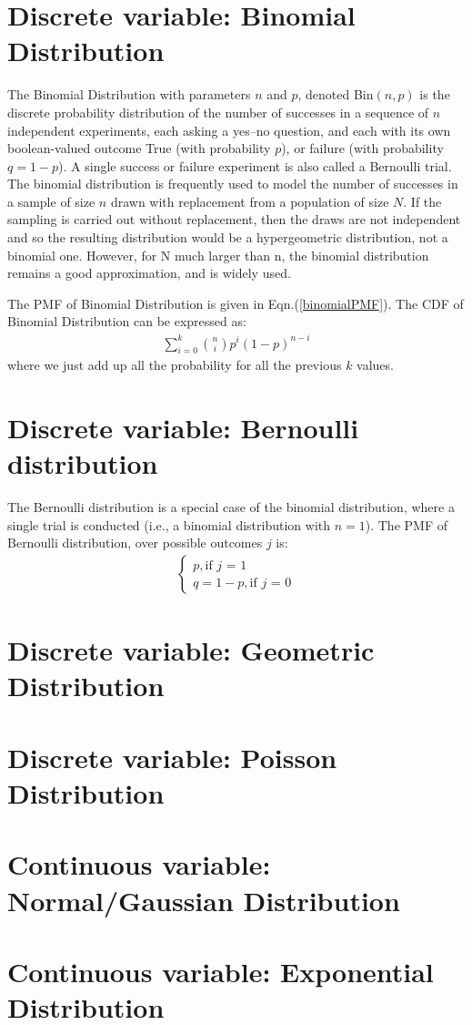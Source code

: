 \section{Discrete variable: Binomial Distribution}

The Binomial Distribution with parameters $n$ and $p$, denoted Bin$(n,p)$ is the discrete probability distribution of the number of successes in a sequence of $n$ independent experiments, each asking a yes–no question, and each with its own boolean-valued outcome True (with probability $p$), or failure (with probability $q = 1- p$). A single success or failure experiment is also called a Bernoulli trial. \\

The binomial distribution is frequently used to model the number of successes in a sample of size $n$ drawn with replacement from a population of size $N$. If the sampling is carried out without replacement, then the draws are not independent and so the resulting distribution would be a hypergeometric distribution, not a binomial one. However, for N much larger than n, the binomial distribution remains a good approximation, and is widely used.

The PMF of Binomial Distribution is given in Eqn.(\ref{binomialPMF}). The CDF of Binomial Distribution can be expressed as:
\begin{eqnarray}
\sum_{i=0}^{k} \binom{n}{i} p^i (1-p)^{n-i}
\label{binomialCDF}
\end{eqnarray}
where we just add up all the probability for all the previous $k$ values.

\section{Discrete variable: Bernoulli distribution}
The Bernoulli distribution is a special case of the binomial distribution, where a single trial is conducted (i.e., a binomial distribution with $n = 1$). The PMF of Bernoulli distribution, over possible outcomes $j$ is:
\begin{eqnarray}
\begin{cases}
p,             \text{if $j$ = 1}\\
q = 1-p,      \text{if $j$ = 0}
\end{cases}
\end{eqnarray}

\section{Discrete variable: Geometric Distribution}

\section{Discrete variable: Poisson Distribution}

\section{Continuous variable: Normal/Gaussian Distribution}

\section{Continuous variable: Exponential Distribution}



